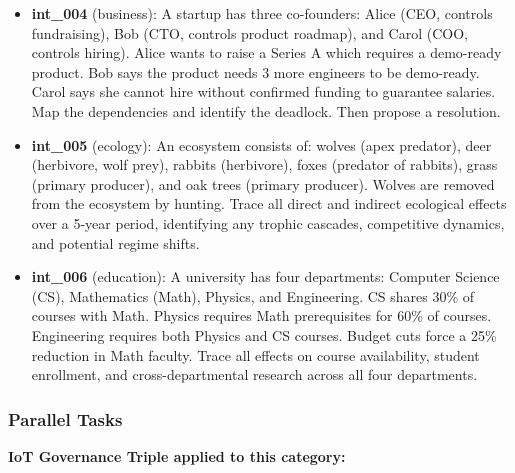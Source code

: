\documentclass[11pt,a4paper]{article}
\begin{document}
\begin{itemize}
\item
  \textbf{int\_004} (business): A startup has three co-founders: Alice
  (CEO, controls fundraising), Bob (CTO, controls product roadmap), and
  Carol (COO, controls hiring). Alice wants to raise a Series A which
  requires a demo-ready product. Bob says the product needs 3 more
  engineers to be demo-ready. Carol says she cannot hire without
  confirmed funding to guarantee salaries. Map the dependencies and
  identify the deadlock. Then propose a resolution.
\item
  \textbf{int\_005} (ecology): An ecosystem consists of: wolves (apex
  predator), deer (herbivore, wolf prey), rabbits (herbivore), foxes
  (predator of rabbits), grass (primary producer), and oak trees
  (primary producer). Wolves are removed from the ecosystem by hunting.
  Trace all direct and indirect ecological effects over a 5-year period,
  identifying any trophic cascades, competitive dynamics, and potential
  regime shifts.
\item
  \textbf{int\_006} (education): A university has four departments:
  Computer Science (CS), Mathematics (Math), Physics, and Engineering.
  CS shares 30\% of courses with Math. Physics requires Math
  prerequisites for 60\% of courses. Engineering requires both Physics
  and CS courses. Budget cuts force a 25\% reduction in Math faculty.
  Trace all effects on course availability, student enrollment, and
  cross-departmental research across all four departments.
\end{itemize}

\subsubsection{Parallel Tasks}\label{parallel-tasks}

\textbf{IoT Governance Triple applied to this category:}
\end{document}
